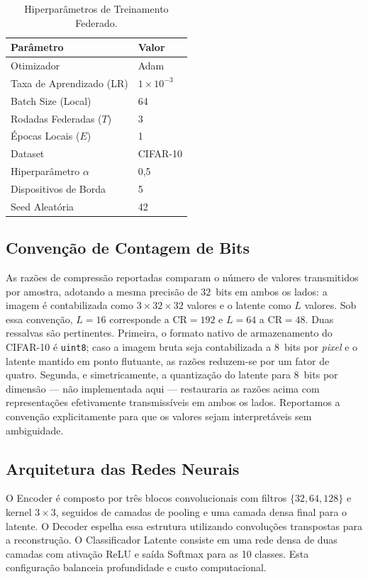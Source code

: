 \documentclass[conference]{IEEEtran}
\begin{document}
\begin{table}[ht]
\centering
\caption{Hiperparâmetros de Treinamento Federado.}
\label{tab:params}
\begin{tabular}{ll}
\toprule
\textbf{Parâmetro} & \textbf{Valor} \\
\midrule
Otimizador & Adam \\
Taxa de Aprendizado (LR) & $1 \times 10^{-3}$ \\
Batch Size (Local) & 64 \\
Rodadas Federadas ($T$) & 3 \\
Épocas Locais ($E$) & 1 \\
Dataset & CIFAR-10 \\
Hiperparâmetro $\alpha$ & 0,5 \\
Dispositivos de Borda & 5 \\
Seed Aleatória & 42 \\
\bottomrule
\end{tabular}
\end{table}

\subsection{Convenção de Contagem de Bits}
\label{subsec:bits}
As razões de compressão reportadas comparam o número de valores transmitidos por amostra, adotando a mesma precisão de $32$~bits em ambos os lados: a imagem é contabilizada como $3 \times 32 \times 32$ valores e o latente como $L$ valores. Sob essa convenção, $L=16$ corresponde a $\mathrm{CR}=192$ e $L=64$ a $\mathrm{CR}=48$. Duas ressalvas são pertinentes. Primeira, o formato nativo de armazenamento do CIFAR-10 é \texttt{uint8}; caso a imagem bruta seja contabilizada a $8$~bits por \textit{pixel} e o latente mantido em ponto flutuante, as razões reduzem-se por um fator de quatro. Segunda, e simetricamente, a quantização do latente para $8$~bits por dimensão --- não implementada aqui --- restauraria as razões acima com representações efetivamente transmissíveis em ambos os lados. Reportamos a convenção explicitamente para que os valores sejam interpretáveis sem ambiguidade.

\subsection{Arquitetura das Redes Neurais}
O Encoder é composto por três blocos convolucionais com filtros $\{32, 64, 128\}$ e kernel $3 \times 3$, seguidos de camadas de pooling e uma camada densa final para o latente. O Decoder espelha essa estrutura utilizando convoluções transpostas para a reconstrução. O Classificador Latente consiste em uma rede densa de duas camadas com ativação ReLU e saída Softmax para as 10 classes. Esta configuração balanceia profundidade e custo computacional.
\end{document}

